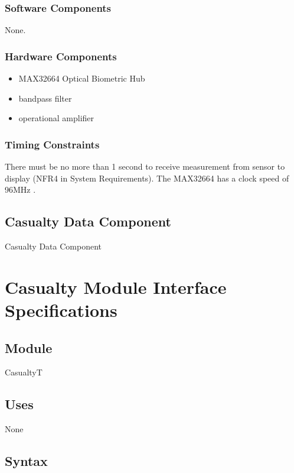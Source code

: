 \documentclass{article}
\newcounter{mnum}
\newcommand{\mthemnum}{M\themnum}
\begin{document}
\begin{description}
        \subsubsection{Software Components}
        None.
        \subsubsection{Hardware Components}
        \begin{itemize}
            \item MAX32664 Optical Biometric Hub
            \item bandpass filter
            \item operational amplifier
        \end{itemize}
        \subsubsection{Timing Constraints}
        There must be no more than 1 second to receive measurement from sensor to display (NFR4 in System Requirements).  The MAX32664 has a clock speed of 96MHz \citep{false}.
    \newpage
    
    \subsection{Casualty Data Component}
    \item [\refstepcounter{mnum} \mthemnum \label{casualty_mod}:] Casualty Data Component
    \section* {Casualty Module Interface Specifications}

        \subsection*{Module}
        
        CasualtyT
        
        \subsection* {Uses}
        
        None
        
        \subsection* {Syntax}
        

\end{description}
\end{document}
